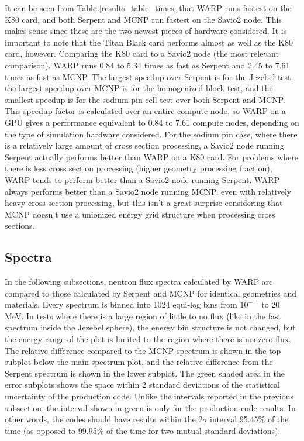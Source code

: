 \documentclass[preprint,12pt]{elsarticle}
\begin{document}
It can be seen from Table \ref{results_table_times} that WARP runs fastest on the K80 card, and both Serpent and MCNP run fastest on the Savio2 node.  This makes sense since these are the two newest pieces of hardware considered.  It is important to note that the Titan Black card performs almost as well as the K80 card, however.  Comparing the K80 card to a Savio2 node (the most relevant comparison), WARP runs 0.84 to 5.34 times as fast as Serpent and 2.45 to 7.61 times as fast as MCNP.   The largest speedup over Serpent is for the Jezebel test, the largest speedup over MCNP is for the homogenized block test, and the smallest speedup is for the sodium pin cell test over both Serpent and MCNP.  This speedup factor is calculated over an entire compute node, so WARP on a GPU gives a performance equivalent to 0.84 to 7.61 compute nodes, depending on the type of simulation hardware considered.  For the sodium pin case, where there is a relatively large amount of cross section processing, a Savio2 node running Serpent actually performs better than WARP on a K80 card.  For problems where there is less cross section processing (higher geometry processing fraction), WARP tends to perform better than a Savio2 node running Serpent.  WARP always performs better than a Savio2 node running MCNP, even with relatively heavy cross section processing, but this isn't a great surprise considering that MCNP doesn't use a unionized energy grid structure when processing cross sections.


\subsection{Spectra}

In the following subsections, neutron flux spectra calculated by WARP are compared to those calculated by Serpent and MCNP for identical geometries and materials.  Every spectrum is binned into 1024 equi-log bins from $10^{-11}$ to $20$ MeV.  In tests where there is a large region of little to no flux (like in the fast spectrum inside the Jezebel sphere), the energy bin structure is not changed, but the energy range of the plot is limited to the region where there is nonzero flux.  The relative difference compared to the MCNP spectrum is shown in the top subplot below the main spectrum plot, and the relative difference from the Serpent spectrum is shown in the lower subplot.  The green shaded area in the error subplots shows the space within 2 standard deviations of the statistical uncertainty of the production code.  Unlike the intervals reported in the previous subsection, the interval shown in green is only for the production code results.  In other words, the codes should have results within the 2$\sigma$ interval 95.45\% of the time (as opposed to 99.95\% of the time for two mutual standard deviations).
\end{document}
